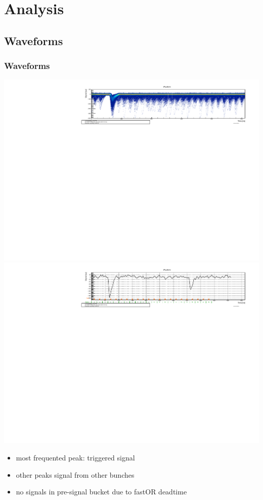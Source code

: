 \documentclass[9pt]{beamer}
\begin{document}
\section{Analysis}
\subsection{Waveforms}
\begin{frame}
	\frametitle{Waveforms}
	\begin{center}
		\includegraphics[angle=270, width=.8\textwidth]{WFStack}\\
		\includegraphics[angle=270, width=.8\textwidth]{Waveform}\\
	\end{center}
	\begin{itemize}
		\item most frequented peak: triggered signal
		\item other peaks signal from other bunches
		\item no signals in pre-signal bucket due to fastOR deadtime
	\end{itemize}
\end{frame}
\end{document}
